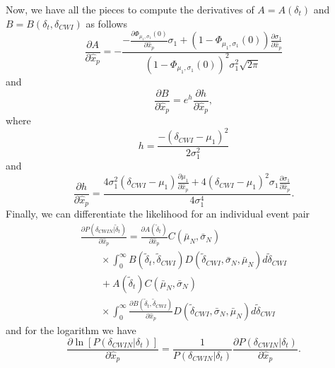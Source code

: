 \documentclass[extra, onecolumn, doublespacing]{gji}
\begin{document}
Now, we have all the pieces to compute the derivatives of $A=A(\delta_t)$ and $B = B(\delta_t,\delta_{CWI})$ as follows
\begin{equation}
\frac{\partial A} {\partial \hat{x}_p} =
-\frac{ -\frac{\partial  \Phi_{\mu_1,\sigma_1}(0)}{\partial \hat{x}_p} \sigma_1 +
 \left(1- \Phi_{\mu_1,\sigma_1}(0) \right) \frac{\partial \sigma_1}{\partial \hat{x}_p}}
{\left(1- \Phi_{\mu_1,\sigma_1}(0) \right)^2 \sigma_1^2 \sqrt{2 \pi}}
\end{equation}
and
\begin{equation}
\frac{\partial B} {\partial \hat{x}_p} = e^h \frac{\partial h}{\partial \hat{x}_p},
\end{equation}
where
\begin{equation}
h =  \frac{-(\delta_{CWI}-\mu_1)^2}{2 \sigma_1^2}
\end{equation}
and
\begin{equation}
\frac{\partial h}{\partial \hat{x}_p} = \frac{
4 \sigma_1^2 (\delta_{CWI}-\mu_1) \frac{\partial \mu_1}{\partial \hat{x}_p}
+ 4(\delta_{CWI}-\mu_1)^2 \sigma_1 \frac{\partial \sigma_1}{\partial \hat{x}_p} }
{4 \sigma_1^4}.
\end{equation}
Finally, we can differentiate the likelihood for an individual event pair
\begin{equation}
\begin{array}{l}
\frac{\partial P(\delta_{CWIN}|\widetilde{\delta}_t)} {\partial \hat{x}_p}  =
\frac{\partial A(\widetilde{\delta}_t)}{\partial \hat{x}_p} C(\bar{\mu}_N, \bar{\sigma}_N) \\
\hspace{2em} \times \int_0^\infty B(\widetilde{\delta}_t,\widetilde{\delta}_{CWI})
D(\widetilde{\delta}_{CWI},\bar{\sigma}_N,\bar{\mu}_N )
d\widetilde{\delta}_{CWI} \\
\hspace{2em} + A(\widetilde{\delta}_t) C(\bar{\mu}_N, \bar{\sigma}_N) \\
\hspace{2em} \times \int_0^\infty
\frac{\partial B(\widetilde{\delta}_t,\widetilde{\delta}_{CWI})} {\partial \hat{x}_p}
D(\widetilde{\delta}_{CWI},\bar{\sigma}_N,\bar{\mu}_N )
d\widetilde{\delta}_{CWI}
\end{array}
\end{equation}
and for the logarithm we have
\begin{equation}
\frac{ \partial \ln \left[ P(\delta_{CWIN}|\delta_t) \right] } {\partial \hat{x}_p}
= \frac{1}{P(\delta_{CWIN}|\delta_t)} \frac{\partial P(\delta_{CWIN}|\delta_t)}{\partial \hat{x}_p}.
\end{equation}
\end{document}
